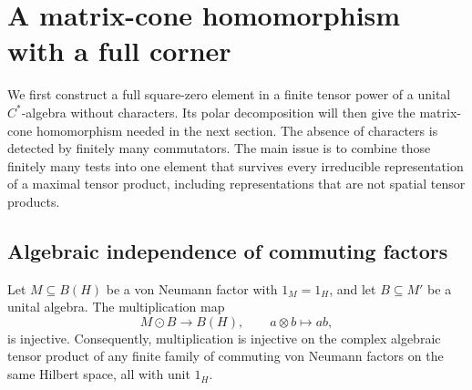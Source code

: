 \section{A matrix-cone homomorphism with a full corner}
\label{sec:tensor}

We first construct a full square-zero element in a finite tensor power of
a unital \(C^*\)-algebra without characters. Its polar decomposition will
then give the matrix-cone homomorphism needed in the next section.
The absence of characters is detected by finitely many commutators.
The main issue is to combine those finitely many tests into one element
that survives every irreducible representation of a maximal tensor
product, including representations that are not spatial tensor products.

\subsection{Algebraic independence of commuting factors}

\begin{lemma}
\label{lem:tensor-independence}
Let \(M\subseteq B(H)\) be a von Neumann factor with \(1_M=1_H\), and let
\(B\subseteq M'\) be a unital algebra. The multiplication map
\[
 M\odot B\longrightarrow B(H),\qquad a\otimes b\longmapsto ab,
\]
is injective. Consequently, multiplication is injective on the complex
algebraic tensor product of any finite family of commuting von Neumann
factors on the same Hilbert space, all with unit \(1_H\).
\end{lemma}

